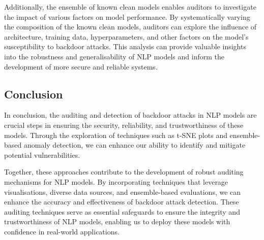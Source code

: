 Additionally, the ensemble of known clean models enables auditors to investigate the impact of various factors on model performance. By systematically varying the composition of the known clean models, auditors can explore the influence of architecture, training data, hyperparameters, and other factors on the model's susceptibility to backdoor attacks. This analysis can provide valuable insights into the robustness and generalisability of NLP models and inform the development of more secure and reliable systems.

\subsection{Conclusion}

In conclusion, the auditing and detection of backdoor attacks in NLP models are crucial steps in ensuring the security, reliability, and trustworthiness of these models. Through the exploration of techniques such as t-SNE plots and ensemble-based anomaly detection, we can enhance our ability to identify and mitigate potential vulnerabilities.

Together, these approaches contribute to the development of robust auditing mechanisms for NLP models. By incorporating techniques that leverage visualisations, diverse data sources, and ensemble-based evaluations, we can enhance the accuracy and effectiveness of backdoor attack detection. These auditing techniques serve as essential safeguards to ensure the integrity and trustworthiness of NLP models, enabling us to deploy these models with confidence in real-world applications.